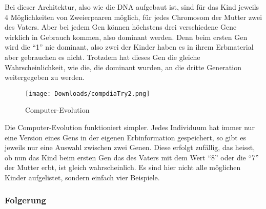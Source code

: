 \documentclass[11pt,a4paper,ngerman]{article}
\begin{document}
Bei dieser Architektur, also wie die DNA aufgebaut ist, sind für das Kind jeweils 4 Möglichkeiten von Zweierpaaren möglich, für jedes Chromosom der Mutter zwei des Vaters. Aber bei jedem Gen können höchstens drei verschiedene Gene wirklich in Gebrauch kommen, also dominant werden. Denn beim ersten Gen wird die \enquote{1} nie dominant, also zwei der Kinder haben es in ihrem Erbmaterial aber gebrauchen es nicht. Trotzdem hat dieses Gen die gleiche Wahrscheinlichkeit, wie die, die dominant wurden, an die dritte Generation weitergegeben zu werden.\\
\begin{figure}[H]
    \begin{center}
        \texttt{[image: Downloads/compdiaTry2.png]}
        \caption{Computer-Evolution}        
    \end{center}
\end{figure}

Die Computer-Evolution funktioniert simpler. Jedes Individuum hat immer nur eine Version eines Gens in der eigenen Erbinformation gespeichert, so gibt es jeweils nur eine Auswahl zwischen zwei Genen. Diese erfolgt zufällig, das heisst, ob nun das Kind beim ersten Gen das des Vaters mit dem Wert \enquote{8} oder die \enquote{7} der Mutter erbt, ist gleich wahrscheinlich. Es sind hier nicht alle möglichen Kinder aufgelistet, sondern einfach vier Beispiele.\\

\subsubsection{Folgerung}
\end{document}

